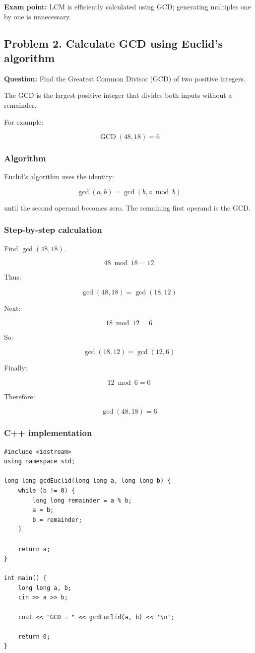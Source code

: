 \textbf{Exam point:} LCM is efficiently calculated using GCD; generating multiples one by one is unnecessary.

\subsection{Problem 2. Calculate GCD using Euclid's algorithm}

\textbf{Question:} Find the Greatest Common Divisor (GCD) of two positive integers.

The GCD is the largest positive integer that divides both inputs without a remainder.

For example:


\[
\operatorname{GCD}(48,18)=6
\]


\subsubsection{Algorithm}

Euclid's algorithm uses the identity:


\[
\boxed{\gcd(a,b)=\gcd(b,a\bmod b)}
\]


until the second operand becomes zero. The remaining first operand is the GCD.

\subsubsection{Step-by-step calculation}

Find $\gcd(48,18)$.


\[
48\bmod18=12
\]


Thus:


\[
\gcd(48,18)=\gcd(18,12)
\]


Next:


\[
18\bmod12=6
\]


So:


\[
\gcd(18,12)=\gcd(12,6)
\]


Finally:


\[
12\bmod6=0
\]


Therefore:


\[
\boxed{\gcd(48,18)=6}
\]


\subsubsection{C++ implementation}

\begin{lstlisting}[style=cppstyle]
#include <iostream>
using namespace std;

long long gcdEuclid(long long a, long long b) {
    while (b != 0) {
        long long remainder = a % b;
        a = b;
        b = remainder;
    }

    return a;
}

int main() {
    long long a, b;
    cin >> a >> b;

    cout << "GCD = " << gcdEuclid(a, b) << '\n';

    return 0;
}
\end{lstlisting}


